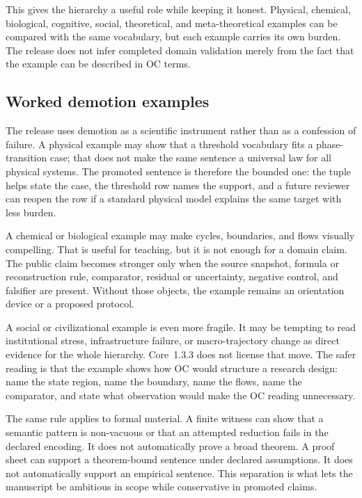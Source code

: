 This gives the hierarchy a useful role while keeping it honest. Physical,
chemical, biological, cognitive, social, theoretical, and meta-theoretical
examples can be compared with the same vocabulary, but each example carries
its own burden. The release does not infer completed domain validation merely
from the fact that the example can be described in OC terms.

\subsection{Worked demotion examples}

The release uses demotion as a scientific instrument rather than as a
confession of failure. A physical example may show that a threshold vocabulary
fits a phase-transition case; that does not make the same sentence a universal
law for all physical systems. The promoted sentence is therefore the bounded
one: the tuple helps state the case, the threshold row names the support, and a
future reviewer can reopen the row if a standard physical model explains the
same target with less burden.

A chemical or biological example may make cycles, boundaries, and flows
visually compelling. That is useful for teaching, but it is not enough for a
domain claim. The public claim becomes stronger only when the source snapshot,
formula or reconstruction rule, comparator, residual or uncertainty, negative
control, and falsifier are present. Without those objects, the example remains
an orientation device or a proposed protocol.

A social or civilizational example is even more fragile. It may be tempting to
read institutional stress, infrastructure failure, or macro-trajectory change
as direct evidence for the whole hierarchy. Core~1.3.3 does not license that
move. The safer reading is that the example shows how OC would structure a
research design: name the state region, name the boundary, name the flows,
name the comparator, and state what observation would make the OC reading
unnecessary.

The same rule applies to formal material. A finite witness can show that a
semantic pattern is non-vacuous or that an attempted reduction fails in the
declared encoding. It does not automatically prove a broad theorem. A proof
sheet can support a theorem-bound sentence under declared assumptions. It does
not automatically support an empirical sentence. This separation is what lets
the manuscript be ambitious in scope while conservative in promoted claims.

